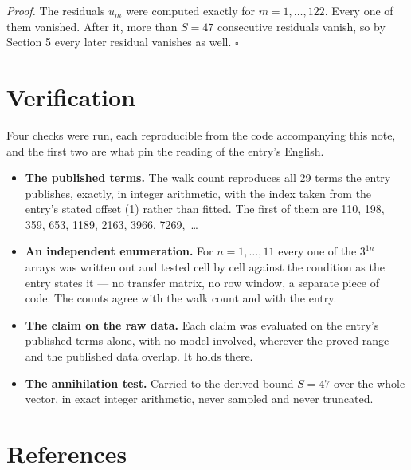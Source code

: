 \documentclass[11pt]{article}
\theoremstyle{definition}
\begin{document}
{\itshape Proof.} The residuals $u_m$ were computed exactly for $m = 1,\dots,122$. Every one of them vanished. After it, more than $S = 47$ consecutive residuals vanish, so by Section 5 every later residual vanishes as well. $\square$

\section{Verification}

Four checks were run, each reproducible from the code accompanying this note, and the first two are what pin the reading of the entry's English.

\begin{itemize}

\item {\bfseries The published terms.} The walk count reproduces all 29 terms the entry publishes, exactly, in integer arithmetic, with the index taken from the entry's stated offset (1) rather than fitted. The first of them are 110, 198, 359, 653, 1189, 2163, 3966, 7269,~\dots

\item {\bfseries An independent enumeration.} For $n = 1,\dots,11$ every one of the $3^{1n}$ arrays was written out and tested cell by cell against the condition as the entry states it --- no transfer matrix, no row window, a separate piece of code. The counts agree with the walk count and with the entry.

\item {\bfseries The claim on the raw data.} Each claim was evaluated on the entry's published terms alone, with no model involved, wherever the proved range and the published data overlap. It holds there.

\item {\bfseries The annihilation test.} Carried to the derived bound $S = 47$ over the whole vector, in exact integer arithmetic, never sampled and never truncated.

\end{itemize}

\section{References}
\end{document}
